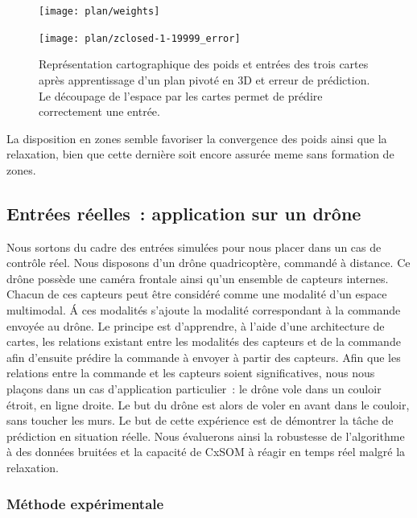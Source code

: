 \documentclass[../main]{subfiles}
\begin{document}
\begin{figure}
	\begin{minipage}{0.48\textwidth}
	\centering\texttt{[image: plan/weights]}
	\end{minipage}
	\begin{minipage}{0.48\textwidth}
	\texttt{[image: plan/zclosed-1-19999\_error]}	
	\end{minipage}	
	\caption{Représentation cartographique des poids et entrées des trois cartes après apprentissage d'un plan pivoté en 3D et erreur de prédiction. Le découpage de l'espace par les cartes permet de prédire correctement une entrée. \label{fig:plan3}}
	\end{figure}

La disposition en zones semble favoriser la convergence des poids ainsi que la relaxation, bien que cette dernière soit encore assurée meme sans formation de zones.

\subsection{Entrées réelles~: application sur un drône}

Nous sortons du cadre des entrées simulées pour nous placer dans un cas de contrôle réel. 
Nous disposons d'un drône quadricoptère, commandé à distance. Ce drône possède une caméra frontale ainsi qu'un ensemble de capteurs internes. Chacun de ces capteurs peut être considéré comme une modalité d'un espace multimodal. \'A ces modalités s'ajoute la modalité correspondant à la commande envoyée au drône.
Le principe est d'apprendre, à l'aide d'une architecture de cartes, les relations existant entre les modalités des capteurs et de la commande afin d'ensuite prédire la commande à envoyer à partir des capteurs.
Afin que les relations entre la commande et les capteurs soient significatives, nous nous plaçons dans un cas d'application particulier~: le drône vole dans un couloir étroit, en ligne droite. Le but du drône est alors de voler en avant dans le couloir, sans toucher les murs.
Le but de cette expérience est de démontrer la tâche de prédiction en situation réelle. Nous évaluerons ainsi la robustesse de l'algorithme à des données bruitées et la capacité de CxSOM à réagir en temps réel malgré la relaxation.

\subsubsection{Méthode expérimentale}
\end{document}
